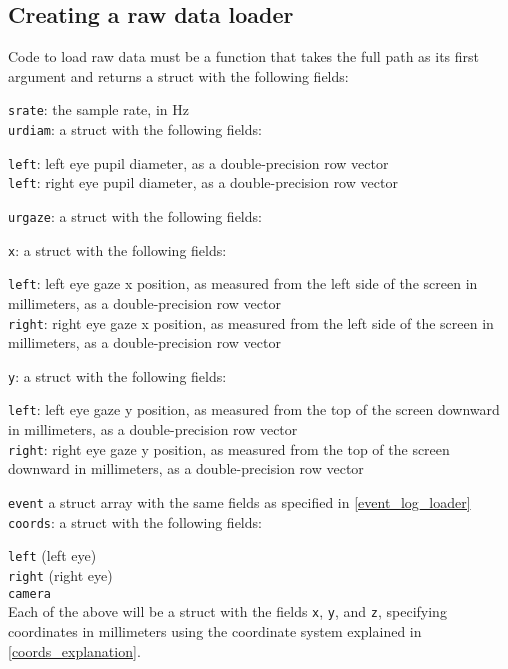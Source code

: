 \documentclass{article}
\begin{document}
\subsection{Creating a raw data loader}
Code to load raw data must be a function that takes the full path as its first argument and returns a struct with the following fields:
\begin{addmargin}[1em]{0em}
\texttt{srate}: the sample rate, in Hz\\
\texttt{urdiam}: a struct with the following fields:
\begin{addmargin}[1em]{0em}
\texttt{left}: left eye pupil diameter, as a double-precision row vector\\
\texttt{left}: right eye pupil diameter, as a double-precision row vector
\end{addmargin}
\texttt{urgaze}: a struct with the following fields:
\begin{addmargin}[1em]{0em}
\texttt{x}: a struct with the following fields:
\begin{addmargin}[1em]{0em}
\texttt{left}: left eye gaze x position, as measured from the left side of the screen in millimeters, as a double-precision row vector\\
\texttt{right}: right eye gaze x position, as measured from the left side of the screen in millimeters, as a double-precision row vector
\end{addmargin}
\texttt{y}: a struct with the following fields:
\begin{addmargin}[1em]{0em}
\texttt{left}: left eye gaze y position, as measured from the top of the screen downward in millimeters, as a double-precision row vector\\
\texttt{right}: right eye gaze y position, as measured from the top of the screen downward in millimeters, as a double-precision row vector
\end{addmargin}
\end{addmargin}
\indent\texttt{event} a struct array with the same fields as specified in \ref{event_log_loader}\\
\texttt{coords}: a struct with the following fields:
\begin{addmargin}[1em]{0em}
\texttt{left} (left eye)\\
\texttt{right} (right eye)\\
\texttt{camera}\\
Each of the above will be a struct with the fields \texttt{x}, \texttt{y}, and \texttt{z}, specifying coordinates in millimeters using the coordinate system explained in \ref{coords_explanation}.
\end{addmargin}
\end{addmargin}
\end{document}
